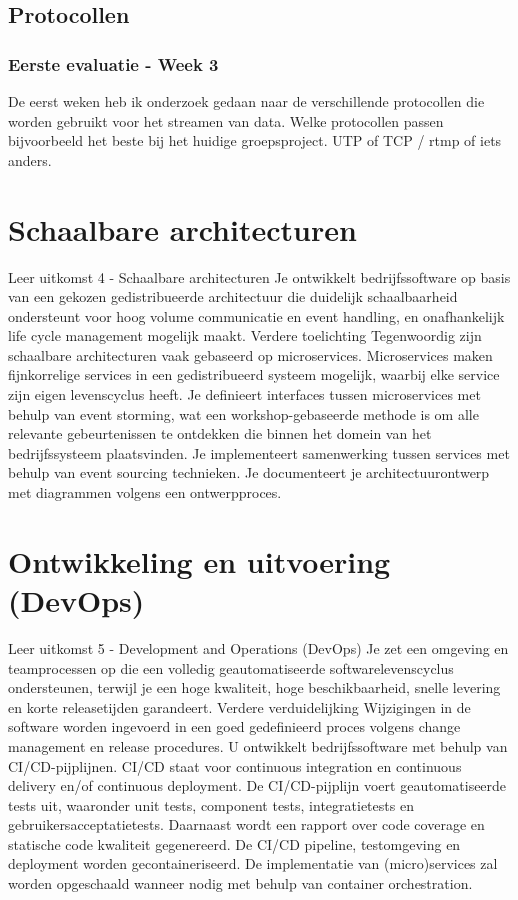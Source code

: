 \subsection{Protocollen}\label{subsec:protocollen}
	\subsubsection{Eerste evaluatie - Week 3}
	De eerst weken heb ik onderzoek gedaan naar de verschillende protocollen die worden gebruikt voor het streamen
	van data.
	Welke protocollen passen bijvoorbeeld het beste bij het huidige groepsproject.
	UTP of TCP / rtmp of iets anders.


\section{Schaalbare architecturen}\label{sec:schaalbare-architecturen}
Leer uitkomst 4 - Schaalbare architecturen Je ontwikkelt bedrijfssoftware op basis van een gekozen gedistribueerde
architectuur die duidelijk schaalbaarheid ondersteunt voor hoog volume communicatie en event handling, en onafhankelijk life cycle management mogelijk maakt.
Verdere toelichting Tegenwoordig zijn schaalbare architecturen vaak gebaseerd op microservices.
Microservices maken fijnkorrelige services in een gedistribueerd systeem mogelijk, waarbij elke service zijn eigen levenscyclus heeft.
Je definieert interfaces tussen microservices met behulp van event storming, wat een workshop-gebaseerde methode is om alle relevante gebeurtenissen te ontdekken die binnen het domein van het bedrijfssysteem plaatsvinden.
Je implementeert samenwerking tussen services met behulp van event sourcing technieken.
Je documenteert je architectuurontwerp met diagrammen volgens een ontwerpproces.






\section{Ontwikkeling en uitvoering (DevOps)}\label{sec:ontwikkeling-en-uitvoering-(devops)}
Leer uitkomst 5 - Development and Operations (DevOps) Je zet een omgeving en teamprocessen op die een volledig geautomatiseerde softwarelevenscyclus ondersteunen, terwijl je een hoge kwaliteit, hoge beschikbaarheid, snelle levering en korte releasetijden garandeert.
Verdere verduidelijking Wijzigingen in de software worden ingevoerd in een goed gedefinieerd proces volgens change management en release procedures.
U ontwikkelt bedrijfssoftware met behulp van CI/CD-pijplijnen.
CI/CD staat voor continuous integration en continuous delivery en/of continuous deployment.
De CI/CD-pijplijn voert geautomatiseerde tests uit, waaronder unit tests, component tests, integratietests en gebruikersacceptatietests.
Daarnaast wordt een rapport over code coverage en statische code kwaliteit gegenereerd.
De CI/CD pipeline, testomgeving en deployment worden gecontaineriseerd.
De implementatie van (micro)services zal worden opgeschaald wanneer nodig met behulp van container orchestration.






